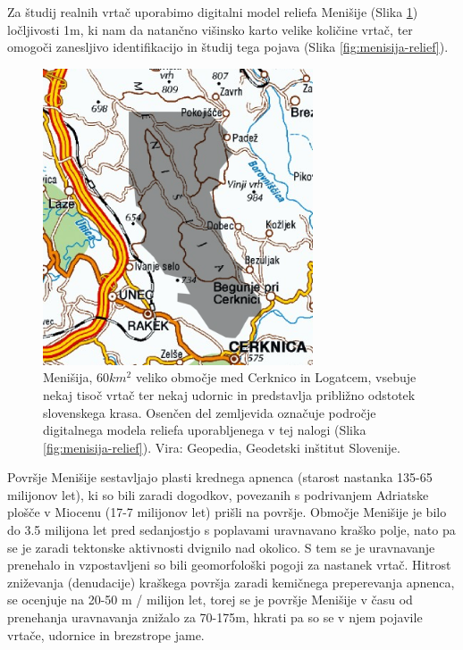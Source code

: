 \documentclass[a4paper, twoside, 12pt]{book}
\begin{document}

  Za študij realnih vrtač uporabimo digitalni model reliefa Menišije (Slika \ref{fig:menisija-karta}) ločljivosti 1m, ki nam da natančno višinsko karto velike količine vrtač, ter omogoči zanesljivo identifikacijo in študij tega pojava (Slika \ref{fig:menisija-relief}).

  \begin{figure}[h]
    \begin{center}
      \includegraphics[width=8cm]{slike/menisija-karta}
    \end{center}
    \caption{Menišija, $60 km^2$ veliko območje med Cerknico in Logatcem, vsebuje nekaj tisoč vrtač ter nekaj udornic in predstavlja približno odstotek slovenskega krasa. Osenčen del zemljevida označuje področje digitalnega modela reliefa uporabljenega v tej nalogi (Slika \ref{fig:menisija-relief}). Vira: Geopedia, Geodetski inštitut Slovenije.}
    \label{fig:menisija-karta}
  \end{figure}

  Površje Menišije sestavljajo plasti krednega apnenca (starost nastanka 135-65 milijonov let), ki so bili zaradi dogodkov, povezanih s podrivanjem Adriatske plošče v Miocenu (17-7 milijonov let) prišli na površje. Območje Menišije je bilo do 3.5 milijona let pred sedanjostjo s poplavami uravnavano kraško polje, nato pa se je zaradi tektonske aktivnosti dvignilo nad okolico. S tem se je uravnavanje prenehalo in vzpostavljeni so bili geomorfološki pogoji za nastanek vrtač.
Hitrost zniževanja (denudacije) kraškega površja zaradi kemičnega preperevanja apnenca, se ocenjuje na 20-50 m / milijon let, torej se je površje Menišije v času od prenehanja uravnavanja znižalo za 70-175m, hkrati pa so se v njem pojavile vrtače, udornice in brezstrope jame. \cite{Vrabec2006} \cite{Placer2010}
\end{document}
